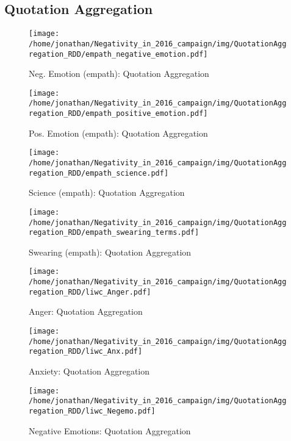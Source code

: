 \subsection{Quotation Aggregation}

\begin{figure}[h]\centering
	\texttt{[image: /home/jonathan/Negativity\_in\_2016\_campaign/img/QuotationAggregation\_RDD/empath\_negative\_emotion.pdf]}
	\caption{Neg. Emotion (empath): Quotation Aggregation}
	\label{fig: qa_Neg. Emotion (empath)}
\end{figure}

\begin{figure}[h]\centering
	\texttt{[image: /home/jonathan/Negativity\_in\_2016\_campaign/img/QuotationAggregation\_RDD/empath\_positive\_emotion.pdf]}
	\caption{Pos. Emotion (empath): Quotation Aggregation}
	\label{fig: qa_Pos. Emotion (empath)}
\end{figure}

\begin{figure}[h]\centering
	\texttt{[image: /home/jonathan/Negativity\_in\_2016\_campaign/img/QuotationAggregation\_RDD/empath\_science.pdf]}
	\caption{Science (empath): Quotation Aggregation}
	\label{fig: qa_Science (empath)}
\end{figure}

\begin{figure}[h]\centering
	\texttt{[image: /home/jonathan/Negativity\_in\_2016\_campaign/img/QuotationAggregation\_RDD/empath\_swearing\_terms.pdf]}
	\caption{Swearing (empath): Quotation Aggregation}
	\label{fig: qa_Swearing (empath)}
\end{figure}

\begin{figure}[h]\centering
	\texttt{[image: /home/jonathan/Negativity\_in\_2016\_campaign/img/QuotationAggregation\_RDD/liwc\_Anger.pdf]}
	\caption{Anger: Quotation Aggregation}
	\label{fig: qa_Anger}
\end{figure}

\begin{figure}[h]\centering
	\texttt{[image: /home/jonathan/Negativity\_in\_2016\_campaign/img/QuotationAggregation\_RDD/liwc\_Anx.pdf]}
	\caption{Anxiety: Quotation Aggregation}
	\label{fig: qa_Anxiety}
\end{figure}

\begin{figure}[h]\centering
	\texttt{[image: /home/jonathan/Negativity\_in\_2016\_campaign/img/QuotationAggregation\_RDD/liwc\_Negemo.pdf]}
	\caption{Negative Emotions: Quotation Aggregation}
	\label{fig: qa_Negative Emotions}
\end{figure}

